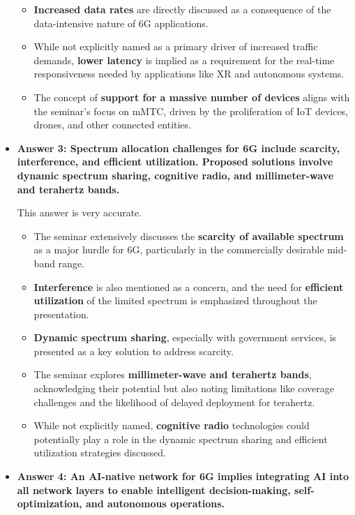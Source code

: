 \documentclass[
]{article}
\begin{document}
\begin{itemize}
\begin{itemize}
  \item
    \textbf{Increased data rates} are directly discussed as a
    consequence of the data-intensive nature of 6G applications.
  \item
    While not explicitly named as a primary driver of increased traffic
    demands, \textbf{lower latency} is implied as a requirement for the
    real-time responsiveness needed by applications like XR and
    autonomous systems.
  \item
    The concept of \textbf{support for a massive number of devices}
    aligns with the seminar's focus on mMTC, driven by the proliferation
    of IoT devices, drones, and other connected entities.
  \end{itemize}
\item
  \textbf{Answer 3: Spectrum allocation challenges for 6G include
  scarcity, interference, and efficient utilization. Proposed solutions
  involve dynamic spectrum sharing, cognitive radio, and millimeter-wave
  and terahertz bands.}

  This answer is very accurate.

  \begin{itemize}
  
  \item
    The seminar extensively discusses the \textbf{scarcity of available
    spectrum} as a major hurdle for 6G, particularly in the commercially
    desirable mid-band range.
  \item
    \textbf{Interference} is also mentioned as a concern, and the need
    for \textbf{efficient utilization} of the limited spectrum is
    emphasized throughout the presentation.
  \item
    \textbf{Dynamic spectrum sharing}, especially with government
    services, is presented as a key solution to address scarcity.
  \item
    The seminar explores \textbf{millimeter-wave and terahertz bands},
    acknowledging their potential but also noting limitations like
    coverage challenges and the likelihood of delayed deployment for
    terahertz.
  \item
    While not explicitly named, \textbf{cognitive radio} technologies
    could potentially play a role in the dynamic spectrum sharing and
    efficient utilization strategies discussed.
  \end{itemize}
\item
  \textbf{Answer 4: An AI-native network for 6G implies integrating AI
  into all network layers to enable intelligent decision-making,
  self-optimization, and autonomous operations.}


\end{itemize}
\end{document}
